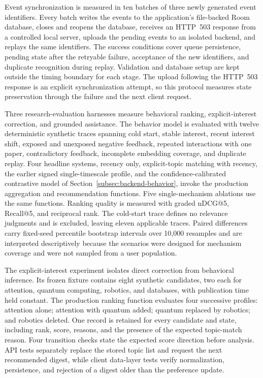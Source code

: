 Event synchronization is measured in ten batches of three newly generated
event identifiers. Every batch writes the events to the application's
file-backed Room database, closes and reopens the database, receives an
HTTP~503 response from a controlled local server, uploads the pending events
to an isolated backend, and replays the same identifiers. The success conditions
cover queue persistence, pending state after the retryable failure, acceptance
of the new identifiers, and duplicate recognition during replay. Validation
and database setup are kept outside the timing boundary for each stage. The
upload following the HTTP~503 response is an explicit synchronization attempt,
so this protocol measures state preservation through the failure and the next
client request.

Three research-evaluation harnesses measure behavioral ranking, explicit-interest correction, and grounded assistance.
The behavior model is evaluated with twelve deterministic synthetic traces spanning cold start, stable interest, recent interest shift, exposed and unexposed negative feedback, repeated interactions with one paper, contradictory feedback, incomplete embedding coverage, and duplicate replay.
Four headline systems, recency only, explicit-topic matching with recency, the earlier signed single-timescale profile, and the confidence-calibrated contrastive model of Section~\ref{subsec:backend-behavior}, invoke the production aggregation and recommendation functions. Five single-mechanism ablations use the same functions.
Ranking quality is measured with graded nDCG@5, Recall@5, and reciprocal rank. The cold-start trace defines no relevance judgments and is excluded, leaving eleven applicable traces. Paired differences carry fixed-seed percentile bootstrap intervals over 10{,}000 resamples and are interpreted descriptively because the scenarios were designed for mechanism coverage and were not sampled from a user population.

The explicit-interest experiment isolates direct correction from behavioral inference. Its frozen fixture contains eight synthetic candidates, two each for attention, quantum computing, robotics, and databases, with publication time held constant. The production ranking function evaluates four successive profiles: attention alone; attention with quantum added; quantum replaced by robotics; and robotics deleted. One record is retained for every candidate and state, including rank, score, reasons, and the presence of the expected topic-match reason. Four transition checks state the expected score direction before analysis. API tests separately replace the stored topic list and request the next recommended digest, while client data-layer tests verify normalization, persistence, and rejection of a digest older than the preference update.

